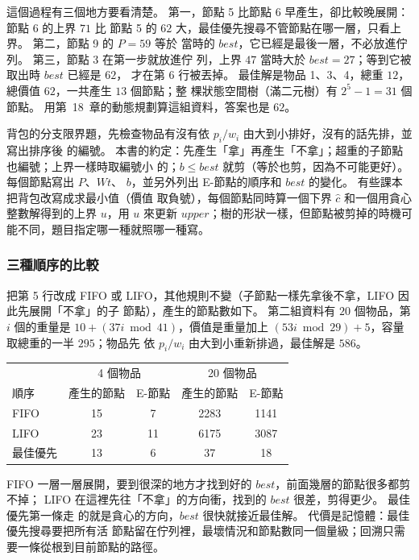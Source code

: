 這個過程有三個地方要看清楚。 第一，節點 5 比節點 6 早產生，卻比較晚展開：節點 6 的上界 $71$ 比
節點 5 的 $62$ 大，最佳優先搜尋不管節點在哪一層，只看上界。 第二，節點 9 的 $P = 59$ 等於
當時的 $\mathit{best}$，它已經是最後一層，不必放進佇列。 第三，節點 3 在第一步就放進佇
列，上界 $47$ 當時大於 $\mathit{best} = 27$；等到它被取出時 $\mathit{best}$ 已經是 $62$，
才在第 6 行被丟掉。 最佳解是物品 1、3、4，總重 $12$，總價值 $62$，一共產生 $13$ 個節點；整
棵狀態空間樹（滿二元樹）有 $2^5 - 1 = 31$ 個節點。 用第~18~章的動態規劃算這組資料，答案也是 $62$。

\begin{examnote}
背包的分支限界題，先檢查物品有沒有依 $p_i / w_i$ 由大到小排好，沒有的話先排，並寫出排序後
的編號。 本書的約定：先產生「拿」再產生「不拿」；超重的子節點也編號；上界一樣時取編號小
的；$b \le \mathit{best}$ 就剪（等於也剪，因為不可能更好）。 每個節點寫出 $P$、$\mathit{Wt}$、
$b$，並另外列出 E-節點的順序和 $\mathit{best}$ 的變化。 有些課本把背包改寫成求最小值（價值
取負號），每個節點同時算一個下界 $\hat c$ 和一個用貪心整數解得到的上界 $u$，用 $u$ 來更新
$\mathit{upper}$；樹的形狀一樣，但節點被剪掉的時機可能不同，題目指定哪一種就照哪一種寫。
\end{examnote}

\subsubsection{三種順序的比較}

把第 5 行改成 FIFO 或 LIFO，其他規則不變（子節點一樣先拿後不拿，LIFO 因此先展開「不拿」的子
節點），產生的節點數如下。 第二組資料有 $20$ 個物品，第 $i$ 個的重量是
$10 + (37 i \bmod 41)$，價值是重量加上 $(53 i \bmod 29) + 5$，容量取總重的一半 $295$；物品先
依 $p_i / w_i$ 由大到小重新排過，最佳解是 $586$。

\begin{center}
\begin{tabular}{lcccc}
\toprule
 & \multicolumn{2}{c}{4 個物品} & \multicolumn{2}{c}{20 個物品} \\
順序 & 產生的節點 & E-節點 & 產生的節點 & E-節點 \\
\midrule
FIFO & 15 & 7 & 2283 & 1141 \\
LIFO & 23 & 11 & 6175 & 3087 \\
最佳優先 & 13 & 6 & 37 & 18 \\
\bottomrule
\end{tabular}
\end{center}

FIFO 一層一層展開，要到很深的地方才找到好的 $\mathit{best}$，前面幾層的節點很多都剪不掉；
LIFO 在這裡先往「不拿」的方向衝，找到的 $\mathit{best}$ 很差，剪得更少。 最佳優先第一條走
的就是貪心的方向，$\mathit{best}$ 很快就接近最佳解。 代價是記憶體：最佳優先搜尋要把所有活
節點留在佇列裡，最壞情況和節點數同一個量級；回溯只需要一條從根到目前節點的路徑。

